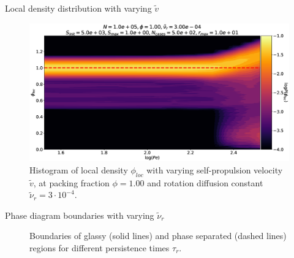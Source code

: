 \documentclass{beamer}
\begin{document}
\begin{frame}{Local density distribution with varying $\tilde{v}$}

\begin{figure}[h!]
  \centering
  \includegraphics[width=0.9\linewidth]{Pphiloc_Dl1000_Rh3000_Nq1000_Io5000_Ml1000_Cn5000.eps}
  \caption{Histogram of local density $\phi_{loc}$ with varying self-propulsion velocity $\tilde{v}$, at packing fraction $\phi=1.00$ and rotation diffusion constant $\tilde{\nu}_r = 3\cdot10^{-4}$.}
\end{figure}

\end{frame}

\begin{frame}{Phase diagram boundaries with varying $\tilde{\nu}_r$}

\begin{figure}[h!]
  \centering
  \caption{Boundaries of glassy (solid lines) and phase separated (dashed lines) regions for different persistence times $\tau_r$.}
\end{figure}

\end{frame}
\end{document}
